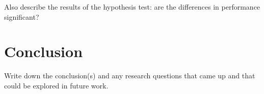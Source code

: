 \documentclass[fleqn,10pt]{articletin}
\begin{document}
Also describe the results of the hypothesis test: are the differences in performance significant?

\section{Conclusion}
\label{sec:conclusie}

Write down the conclusion(s) and any research questions that came up and that could be explored in future work.


\printbibliography[heading=bibintoc]
\end{document}
